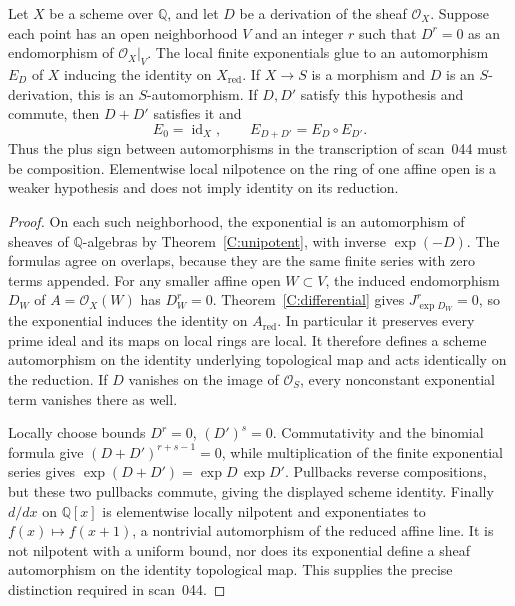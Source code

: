 \begin{proposition}
\label{C:sheaf-globalization}
Let $X$ be a scheme over $\mathbb Q$, and let $D$ be a derivation of the sheaf $\mathcal O_X$. Suppose each point has an open neighborhood $V$ and an integer $r$ such that $D^r=0$ as an endomorphism of $\mathcal O_X|_V$. The local finite exponentials glue to an automorphism $E_D$ of $X$ inducing the identity on $X_{\mathrm{red}}$. If $X\to S$ is a morphism and $D$ is an $S$-derivation, this is an $S$-automorphism. If $D,D'$ satisfy this hypothesis and commute, then $D+D'$ satisfies it and
\[
 E_0=\operatorname{id}_X,\qquad E_{D+D'}=E_D\circ E_{D'}.
\]
Thus the plus sign between automorphisms in the transcription of scan~044 must be composition. Elementwise local nilpotence on the ring of one affine open is a weaker hypothesis and does not imply identity on its reduction.
\end{proposition}
\begin{proof}
On each such neighborhood, the exponential is an automorphism of sheaves of $\mathbb Q$-algebras by Theorem~\ref{C:unipotent}, with inverse $\exp(-D)$. The formulas agree on overlaps, because they are the same finite series with zero terms appended. For any smaller affine open $W\subset V$, the induced endomorphism $D_W$ of $A=\mathcal O_X(W)$ has $D_W^r=0$. Theorem~\ref{C:differential} gives $J_{\exp D_W}^r=0$, so the exponential induces the identity on $A_{\mathrm{red}}$. In particular it preserves every prime ideal and its maps on local rings are local. It therefore defines a scheme automorphism on the identity underlying topological map and acts identically on the reduction. If $D$ vanishes on the image of $\mathcal O_S$, every nonconstant exponential term vanishes there as well.

Locally choose bounds $D^r=0$, $(D')^s=0$. Commutativity and the binomial formula give $(D+D')^{r+s-1}=0$, while multiplication of the finite exponential series gives $\exp(D+D')=\exp D\,\exp D'$. Pullbacks reverse compositions, but these two pullbacks commute, giving the displayed scheme identity. Finally $d/dx$ on $\mathbb Q[x]$ is elementwise locally nilpotent and exponentiates to $f(x)\mapsto f(x+1)$, a nontrivial automorphism of the reduced affine line. It is not nilpotent with a uniform bound, nor does its exponential define a sheaf automorphism on the identity topological map. This supplies the precise distinction required in scan~044.
\end{proof}

